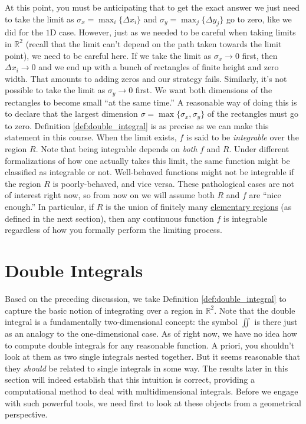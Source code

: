 At this point, you must be anticipating that to get the exact answer we just need to take the limit as $\sigma_x = \max_i \{\Delta x_i\}$ and $\sigma_y = \max_j \{\Delta y_j\}$ go to zero, like we did for the $1\text{D}$ case. However, just as we needed to be careful when taking limits in $\mathbb{R}^2$ (recall that the limit can't depend on the path taken towards the limit point), we need to be careful here. If we take the limit as $\sigma_x \rightarrow 0$ first, then $\Delta x_i \rightarrow 0$ and we end up with a bunch of rectangles of finite height and zero width. That amounts to adding zeros and our strategy fails. Similarly, it's not possible to take the limit as $\sigma_y \rightarrow 0$ first. We want both dimensions of the rectangles to become small ``at the same time.'' A reasonable way of doing this is to declare that the largest dimension $\sigma = \max \{\sigma_x, \sigma_y \}$ of the rectangles must go to zero. Definition \ref{def:double_integral} is as precise as we can make this statement in this course. When the limit exists, $f$ is said to be \textit{integrable} over the region $R$. Note that being integrable depends on \textit{both} $f$ and $R$. Under different formalizations of how one actually takes this limit, the same function might be classified as integrable or not. Well-behaved functions might not be integrable if the region $R$ is poorly-behaved, and vice versa. These pathological cases are not of interest right now, so from now on we will assume both $R$ and $f$ are ``nice enough.'' In particular, if $R$ is the union of finitely many \hyperref[def:elementary_regions]{elementary regions} (as defined in the next section), then any continuous function $f$ is integrable regardless of how you formally perform the limiting process.


\section{Double Integrals}
\label{sec:double_integrals}

Based on the preceding discussion, we take Definition \ref{def:double_integral} to capture the basic notion of integrating over a region in $\mathbb{R}^2$. Note that the double integral is a fundamentally two-dimensional concept: the symbol $\iint$ is there just as an analogy to the one-dimensional case. As of right now, we have no idea how to compute double integrals for any reasonable function. A priori, you shouldn't look at them as two single integrals nested together. But it seems reasonable that they \textit{should} be related to single integrals in some way. The results later in this section will indeed establish that this intuition is correct, providing a computational method to deal with multidimensional integrals. Before we engage with such powerful tools, we need first to look at these objects from a geometrical perspective.

